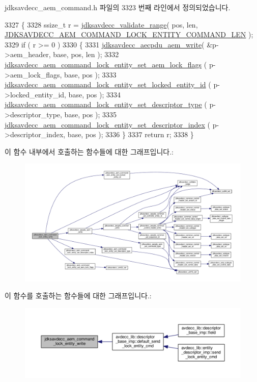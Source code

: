 jdksavdecc\+\_\+aem\+\_\+command.\+h 파일의 3323 번째 라인에서 정의되었습니다.


\begin{DoxyCode}
3327 \{
3328     ssize\_t r = \hyperlink{group__util_ga9c02bdfe76c69163647c3196db7a73a1}{jdksavdecc\_validate\_range}( pos, len, 
      \hyperlink{group__command__lock__entity_gaae9fdce1f4e3de3d6a0829b4b077b418}{JDKSAVDECC\_AEM\_COMMAND\_LOCK\_ENTITY\_COMMAND\_LEN} );
3329     \textcolor{keywordflow}{if} ( r >= 0 )
3330     \{
3331         \hyperlink{group__aecpdu__aem_gad658e55771cce77cecf7aae91e1dcbc5}{jdksavdecc\_aecpdu\_aem\_write}( &p->aem\_header, base, pos, len );
3332         \hyperlink{group__command__lock__entity_ga4bcd285b45e809e4db88edd407f876e3}{jdksavdecc\_aem\_command\_lock\_entity\_set\_aem\_lock\_flags}
      ( p->aem\_lock\_flags, base, pos );
3333         \hyperlink{group__command__lock__entity_ga20873c2654d4ee349d3b1e5ec53f172d}{jdksavdecc\_aem\_command\_lock\_entity\_set\_locked\_entity\_id}
      ( p->locked\_entity\_id, base, pos );
3334         \hyperlink{group__command__lock__entity_ga403a35e4062fd1a0a55169292f5bffe3}{jdksavdecc\_aem\_command\_lock\_entity\_set\_descriptor\_type}
      ( p->descriptor\_type, base, pos );
3335         \hyperlink{group__command__lock__entity_ga3d11dc57e27016ab5848e1cf5c389a8e}{jdksavdecc\_aem\_command\_lock\_entity\_set\_descriptor\_index}
      ( p->descriptor\_index, base, pos );
3336     \}
3337     \textcolor{keywordflow}{return} r;
3338 \}
\end{DoxyCode}


이 함수 내부에서 호출하는 함수들에 대한 그래프입니다.\+:
\nopagebreak
\begin{figure}[H]
\begin{center}
\leavevmode
\includegraphics[width=350pt]{group__command__lock__entity_ga72e701eb5960e2b447364aab20d03b51_cgraph}
\end{center}
\end{figure}




이 함수를 호출하는 함수들에 대한 그래프입니다.\+:
\nopagebreak
\begin{figure}[H]
\begin{center}
\leavevmode
\includegraphics[width=350pt]{group__command__lock__entity_ga72e701eb5960e2b447364aab20d03b51_icgraph}
\end{center}
\end{figure}


